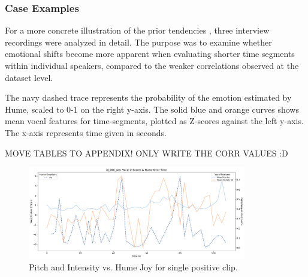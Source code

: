   


\subsubsection{Case Examples}
For a more concrete illustration of the prior tendencies , three interview recordings were analyzed in detail. The purpose was to examine whether emotional shifts become more apparent when evaluating shorter time segments within individual speakers, compared to the weaker correlations observed at the dataset level.

The navy dashed trace represents the probability of the emotion estimated by Hume, scaled to 0-1 on the right y-axis. 
The solid blue and orange curves shows mean vocal features for time-segments, plotted as Z-scores against the left y-axis. The x-axis represents time given in seconds.


\medskip

MOVE TABLES TO APPENDIX! ONLY WRITE THE CORR VALUES :D 

\medskip

\begin{figure}[H]
    \centering
    
    \includegraphics[width=0.85\textwidth]{png/results/rq3_2/combined_zscore_hume_id_006_pos_4.pdf}
    \caption{Pitch and Intensity vs. Hume Joy for single positive clip.}
    \label{fig:006_pos-joy}
\end{figure}

